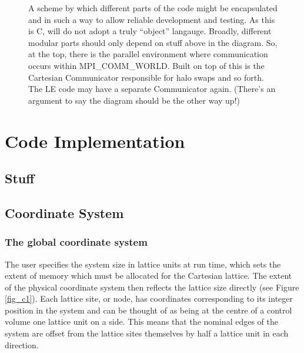 \begin{figure}
\begin{center}
\end{center}
\caption{A scheme by which different parts of the code might be
encapsulated and in such a way to allow reliable development and
testing. As this is C, will do not adopt a truly ``object'' langauge.
Broadly, different modular parts should only depend on stuff above
in the diagram. So, at the top, there is the parallel environment
where communication occurs within MPI\_COMM\_WORLD. Built on top
of this is the Cartesian Communicator responsible for halo swaps
and so forth. The LE code may have a separate Communicator again. 
(There's an argument to say the diagram should be the other way up!)}
\end{figure}



\section{Code Implementation}

\subsection{Stuff}

\subsection{Coordinate System}

\subsubsection{The global coordinate system}

The user specifies the system size in lattice units at run time,
which sets the extent of memory which must be allocated for the
Cartesian lattice. The extent of the physical coordinate system
then reflects the lattice size directly (see Figure \ref{fig_c1}). 
Each lattice site, or node,  has coordinates corresponding to its
integer position in the system and can be thought of as being
at the centre of a control volume one lattice unit on a side.
This means that the nominal edges of the
system are offset from the lattice sites themselves by half a
lattice unit in each direction.


